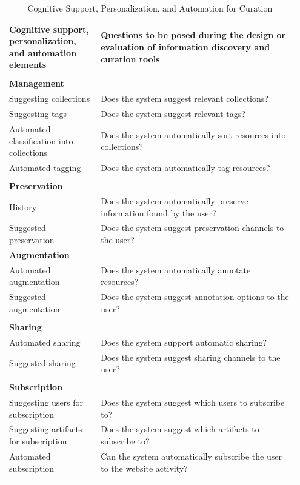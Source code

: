 \documentclass{sigchi}
\begin{document}
{{\begin{table}[ht!]
\caption{Cognitive Support, Personalization, and Automation for Curation}
\label{table:curation_support}
\begin{tabular}{| p{0.30\linewidth}|p{0.65\linewidth}|}
\hline
Cognitive support, personalization, and automation elements & Questions to be posed during the design or evaluation of information discovery and curation tools \\
\hline
& \\
\textbf{Management}		& \\
Suggesting collections  & Does the system suggest relevant collections? \\
Suggesting tags         & Does the system suggest relevant tags? \\
Automated classification into collections  	& Does the system automatically sort resources into collections? \\
Automated tagging       & Does the system automatically tag resources? \\
& \\
\textbf{Preservation}   & \\
History       			& Does the system automatically preserve information found by the user? \\
Suggested preservation  & Does the system suggest preservation channels to the user? \\
\textbf{Augmentation} 	& \\
Automated augmentation  & Does the system automatically annotate resources? \\
Suggested augmentation  & Does the system suggest annotation options to the user? \\    
& \\
\textbf{Sharing}        & \\
Automated sharing		& Does the system support automatic sharing? \\
Suggested sharing		& Does the system suggest sharing channels to the user? \\
& \\
\textbf{Subscription}   & \\
Suggesting users for subscription & Does the system suggest which users to subscribe to? \\
Suggesting artifacts for subscription   & Does the system suggest which artifacts to subscribe to? \\ 
Automated subscription  & Can the system automatically subscribe the user to the website activity? \\
&\\
\hline  
\end{tabular}
\end{table}

}}
\end{document}
